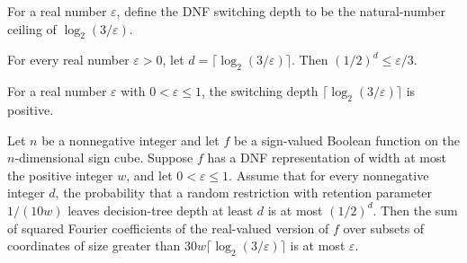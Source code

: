 \begin{definition}
\label{FABL.dnfSwitchingDepth}
\leanok
For a real number $\varepsilon$, define the DNF switching depth to be the natural-number
ceiling of $\log_2(3/\varepsilon)$.
\end{definition}

\begin{theorem}
\label{FABL.half_pow_dnfSwitchingDepth_le}
\leanok
{}
For every real number $\varepsilon>0$, let $d=\lceil\log_2(3/\varepsilon)\rceil$. Then
$(1/2)^d\le \varepsilon/3$.
\end{theorem}

\begin{theorem}
\label{FABL.dnfSwitchingDepth_pos}
\leanok
{}
For a real number $\varepsilon$ with $0<\varepsilon\le 1$, the switching depth
$\lceil\log_2(3/\varepsilon)\rceil$ is positive.
\end{theorem}

\begin{theorem}
\label{FABL.theorem4_22_of_switchingFailureProbability_le_half_pow}
\leanok
{}
Let $n$ be a nonnegative integer and let $f$ be a sign-valued Boolean function on the
$n$-dimensional sign cube. Suppose $f$ has a DNF representation of width at most the
positive integer $w$, and let $0<\varepsilon\le1$. Assume that for every nonnegative
integer $d$, the probability that a random restriction with retention parameter
$1/(10w)$ leaves decision-tree depth at least $d$ is at most $(1/2)^d$. Then the sum of
squared Fourier coefficients of the real-valued version of $f$ over subsets of
coordinates of size greater than $30w\lceil\log_2(3/\varepsilon)\rceil$ is at most
$\varepsilon$.
\end{theorem}

